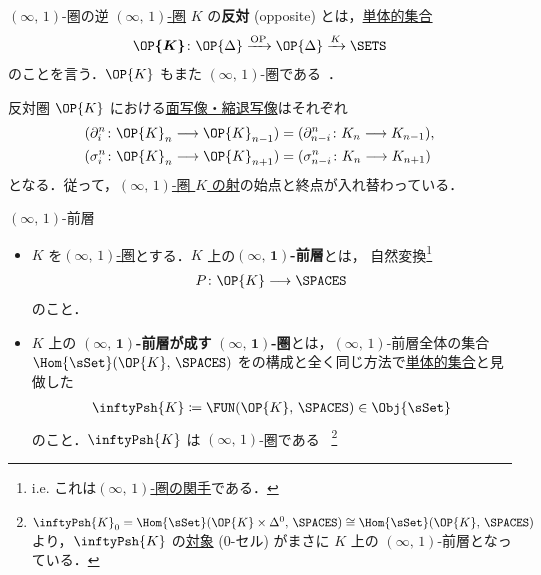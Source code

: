 \documentclass[TQFT_main]{subfiles}
\begin{document}
\begin{mydef}[label=def:op-infty]{{$(\infty,\, 1)$}-圏の逆}
    \hyperref[def:infinity-1]{$(\infty,\, 1)$-圏} $K$ の\textbf{反対} (opposite) とは，\hyperref[def:SimpSet]{単体的集合}
    \begin{align}
        \bm{\OP{K}} \colon \OP{\Delta} \xrightarrow{\mathrm{OP}} \OP{\Delta} \xrightarrow{K} \SETS
    \end{align}
    のことを言う．$\OP{K}$ もまた $(\infty,\, 1)$-圏である~\cite[\href{https://kerodon.net/tag/003S}{Tag 003S}]{kerodon}．
\end{mydef}

反対圏 $\OP{K}$ における\hyperref[def:SimpSet]{面写像・縮退写像}はそれぞれ
\begin{align}
    (\partial^n_i \colon \OP{K}_n \lto \OP{K}_{n-1}) &= (\partial^n_{n-i} \colon K_n \lto K_{n-1}), \\
    (\sigma^n_i \colon \OP{K}_n \lto \OP{K}_{n+1}) &= (\sigma^n_{n-i} \colon K_n \lto K_{n+1})
\end{align}
となる．従って，\hyperref[def:infinity-1]{$(\infty,\, 1)$-圏 $K$ の射}の始点と終点が入れ替わっている．

\begin{mydef}[label=def:infinity-presheaf]{{$(\infty,\, 1)$}-前層}
    \begin{itemize}
        \item     
        $K$ を\hyperref[def:infinity-1]{$(\infty,\, 1)$-圏}とする．$K$ 上の\textbf{$\bm{(\infty,\, 1)}$-前層}とは，
        自然変換\footnote{i.e. これは\hyperref[def:infinity-1]{$(\infty,\, 1)$-圏の関手}である．}
        \begin{align}
            P \colon \OP{K} \lto \SPACES
        \end{align}
        のこと．
        \item $K$ 上の $\bm{(\infty,\, 1)}$\textbf{-前層が成す} $\bm{(\infty,\, 1)}$\textbf{-圏}とは，$(\infty,\, 1)$-前層全体の集合 $\Hom{\sSet} (\OP{K},\, \SPACES)$ をの構成と全く同じ方法で\hyperref[def:SimpSet]{単体的集合}と見做した
        \begin{align}
            \inftyPsh{K} \coloneqq \FUN(\OP{K},\, \SPACES) \in \Obj{\sSet}
        \end{align}
        のこと．$\inftyPsh{K}$ は $(\infty,\, 1)$-圏である~\cite[\href{https://kerodon.net/tag/0066}{Tag 0066}]{kerodon}
        \footnote{$\inftyPsh{K}_0 = \Hom{\sSet} (\OP{K} \times \Delta^0,\, \SPACES) \cong \Hom{\sSet}(\OP{K},\, \SPACES)$ より，$\inftyPsh{K}$ の\hyperref[def:infinity-1]{対象} (0-セル) がまさに $K$ 上の $(\infty,\, 1)$-前層となっている．}
    \end{itemize}
\end{mydef}
\end{document}
